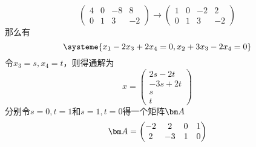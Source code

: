 \begin{solution}
\[\begin{pmatrix}
            4 & 0 & -8 & 8  \\
            0 & 1 & 3  & -2
        \end{pmatrix}
        \longrightarrow
        \begin{pmatrix}
            1 & 0 & -2 & 2  \\
            0 & 1 & 3  & -2
        \end{pmatrix}
    \]
    那么有
    \[
        \systeme{
            x_1 -2x_3 + 2x_4 = 0,
            x_2 + 3x_3 - 2x_4 = 0
        }
    \]
    令$x_3 = s, x_4=t$，则得通解为
    \[
        x =
        \begin{pmatrix}
            2s - 2t \\
            -3s+2t  \\
            s       \\
            t
        \end{pmatrix}
    \]
    分别令$s=0,t=1$和$s=1,t=0$得一个矩阵$\mat{A}$
    \[
        \mat{A} =
        \begin{pmatrix}
            -2 & 2  & 0 & 1 \\
            2  & -3 & 1 & 0
        \end{pmatrix}
    \]
\end{solution}